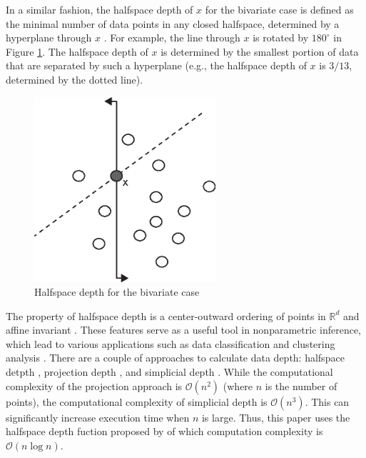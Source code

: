 \documentclass[a4paper,UKenglish]{lipics-v2016}
\begin{document}
In a similar fashion, the halfspace depth of $x$ for the bivariate case is defined as the minimal number of data points in any closed halfspace, determined by a hyperplane through $x$ \cite{rousseeuw96RSS}. For example, the line through $x$ is rotated by $180^{\circ}$ in Figure \ref{fig:hd_bi}. The halfspace depth of $x$ is determined by the smallest portion of data that are separated by such a hyperplane (e.g.,  the halfspace depth of $x$ is $3/13$, determined by the dotted line).
 
\begin{figure}
	\centering
	\includegraphics[width=0.6\textwidth]{images/depth_bi.eps}
	\caption{Halfspace depth for the bivariate case}
	\label{fig:hd_bi}	
\end{figure}

The property of halfspace depth is a center-outward ordering of points in  $\mathbb{R}^d$ and affine invariant \cite{Mosler13book}. These features serve as a useful tool in nonparametric inference, which lead to various applications such as data classification and clustering analysis
\cite{lange14fSP,jeong16acmgis}. There are a couple of approaches to calculate data depth: halfspace detpth \cite{rousseeuw96RSS}, projection depth \cite{wilcox03CSSC}, and simplicial depth \cite{liu90AS}. While the computational complexity of the projection approach is $\mathcal{O}(n^2)$ (where $n$ is the number of points), the computational complexity of simplicial depth is $\mathcal{O}(n^3)$. This can significantly increase execution time when $n$ is large. Thus, this paper uses the halfspace depth fuction proposed by \cite{rousseeuw96RSS} of which computation complexity is $\mathcal{O}(n\log{}n)$.
\end{document}
